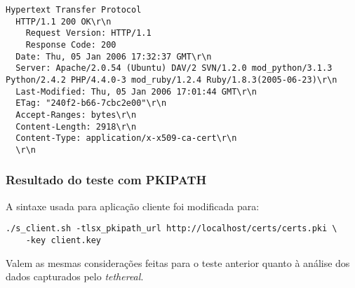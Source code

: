 \begin{lstlisting}[caption={Início (cabeçalho) da resposta HTTP enviada pelo servidor para a aplicação \texttt{s\_server}}]
Hypertext Transfer Protocol 
  HTTP/1.1 200 OK\r\n 
    Request Version: HTTP/1.1 
    Response Code: 200 
  Date: Thu, 05 Jan 2006 17:32:37 GMT\r\n 
  Server: Apache/2.0.54 (Ubuntu) DAV/2 SVN/1.2.0 mod_python/3.1.3 Python/2.4.2 PHP/4.4.0-3 mod_ruby/1.2.4 Ruby/1.8.3(2005-06-23)\r\n 
  Last-Modified: Thu, 05 Jan 2006 17:01:44 GMT\r\n 
  ETag: "240f2-b66-7cbc2e00"\r\n 
  Accept-Ranges: bytes\r\n 
  Content-Length: 2918\r\n 
  Content-Type: application/x-x509-ca-cert\r\n 
  \r\n
\end{lstlisting}

\subsubsection{Resultado do teste com PKIPATH}

A sintaxe usada para aplicação cliente foi modificada para:

\begin{lstlisting}
./s_client.sh -tlsx_pkipath_url http://localhost/certs/certs.pki \ 
    -key client.key
\end{lstlisting}

Valem as mesmas considerações feitas para o teste anterior quanto à análise dos 
dados capturados pelo \emph{tethereal}.

